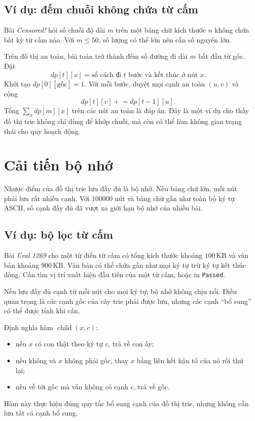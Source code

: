 \documentclass[11pt]{article}
\begin{document}
\subsection{Ví dụ: đếm chuỗi không chứa từ cấm}

Bài \textit{Censored!} hỏi số chuỗi độ dài \(m\) trên một bảng chữ kích thước
\(n\) không chứa bất kỳ từ cấm nào. Với \(m\le 50\), số lượng có thể lớn nên
cần số nguyên lớn.

Trên đồ thị an toàn, bài toán trở thành đếm số đường đi dài \(m\) bắt đầu từ
gốc. Đặt
\[
  dp[t][x]=\text{số cách đi }t\text{ bước và kết thúc ở nút }x.
\]
Khởi tạo \(dp[0][\text{gốc}]=1\). Với mỗi bước, duyệt mọi cạnh an toàn
\((u,v)\) và cộng
\[
  dp[t][v]\mathrel{+}=dp[t-1][u].
\]
Tổng \(\sum_x dp[m][x]\) trên các nút an toàn là đáp án. Đây là một ví dụ cho
thấy đồ thị trie không chỉ dùng để khớp chuỗi, mà còn có thể làm không gian
trạng thái cho quy hoạch động.

\section{Cải tiến bộ nhớ}

Nhược điểm của đồ thị trie lưu đầy đủ là bộ nhớ. Nếu bảng chữ lớn, mỗi nút
phải lưu rất nhiều cạnh. Với \(100000\) nút và bảng chữ gần như toàn bộ ký tự
ASCII, số cạnh đầy đủ đã vượt xa giới hạn bộ nhớ của nhiều bài.

\subsection{Ví dụ: bộ lọc từ cấm}

Bài \textit{Ural 1269} cho một từ điển từ cấm có tổng kích thước khoảng
\(100\,\mathrm{KB}\) và văn bản khoảng \(900\,\mathrm{KB}\). Văn bản có thể
chứa gần như mọi ký tự trừ ký tự kết thúc dòng. Cần tìm vị trí xuất hiện đầu
tiên của một từ cấm, hoặc in \texttt{Passed}.

Nếu lưu đầy đủ cạnh từ mỗi nút cho mọi ký tự, bộ nhớ không chịu nổi. Điều quan
trọng là các cạnh gốc của cây trie phải được lưu, nhưng các cạnh ``bổ sung''
có thể được tính khi cần.

Định nghĩa hàm \(\operatorname{child}(x,c)\):
\begin{itemize}
  \item nếu \(x\) có con thật theo ký tự \(c\), trả về con ấy;
  \item nếu không và \(x\) không phải gốc, thay \(x\) bằng liên kết hậu tố của
  nó rồi thử lại;
  \item nếu về tới gốc mà vẫn không có cạnh \(c\), trả về gốc.
\end{itemize}
Hàm này thực hiện đúng quy tắc bổ sung cạnh của đồ thị trie, nhưng không cần
lưu tất cả cạnh bổ sung.
\end{document}
